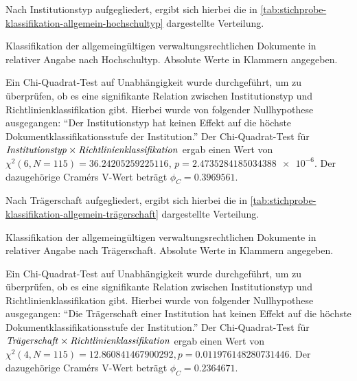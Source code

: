 Nach Institutionstyp aufgegliedert, ergibt sich hierbei die in \cref{tab:stichprobe-klassifikation-allgemein-hochschultyp} dargestellte Verteilung.
\begin{table}[!htbp]
	\caption{Klassifikation der allgemeingültigen verwaltungsrechtlichen Dokumente in relativer Angabe nach Hochschultyp. Absolute Werte in Klammern angegeben.}
    
	\label{tab:stichprobe-klassifikation-allgemein-hochschultyp}
\end{table}
Ein Chi-Quadrat-Test auf Unabhängigkeit wurde durchgeführt, um zu überprüfen, ob es eine signifikante Relation zwischen Institutionstyp und Richtlinienklassifikation gibt.
Hierbei wurde von folgender Nullhypothese ausgegangen:
\enquote{Der Institutionstyp hat keinen Effekt auf die höchste Dokumentklassifikationsstufe der Institution.}
Der Chi-Quadrat-Test für $\text{\textit{Institutionstyp}}\times\text{\textit{Richtlinienklassifikation}}$ ergab einen Wert von $\chi^2 (\num{6}, N = \num{115}) = \num[round-mode=places,round-precision=3]{36,24205259225116}$, $p = \num[round-mode=places,round-precision=3]{2,4735284185034388e-6}$.
Der dazugehörige Cramérs V-Wert beträgt $\phi_C=\num[round-mode=places,round-precision=3]{0.3969561}$.

Nach Trägerschaft aufgegliedert, ergibt sich hierbei die in \cref{tab:stichprobe-klassifikation-allgemein-trägerschaft} dargestellte Verteilung.
\begin{table}[!htbp]
	\caption{Klassifikation der allgemeingültigen verwaltungsrechtlichen Dokumente in relativer Angabe nach Trägerschaft. Absolute Werte in Klammern angegeben.}
    
	\label{tab:stichprobe-klassifikation-allgemein-trägerschaft}
\end{table}
Ein Chi-Quadrat-Test auf Unabhängigkeit wurde durchgeführt, um zu überprüfen, ob es eine signifikante Relation zwischen Institutionstyp und Richtlinienklassifikation gibt.
Hierbei wurde von folgender Nullhypothese ausgegangen:
\enquote{Die Trägerschaft einer Institution hat keinen Effekt auf die höchste Dokumentklassifikationsstufe der Institution.}
Der Chi-Quadrat-Test für $\text{\textit{Trägerschaft}}\times\text{\textit{Richtlinienklassifikation}}$ ergab einen Wert von $\chi^2 (\num{4}, N = \num{115}) = \num[round-mode=places,round-precision=3]{12,860841467900292}, p = \num[round-mode=places,round-precision=3]{0,011976148280731446}$.
Der dazugehörige Cramérs V-Wert beträgt $\phi_C=\num[round-mode=places,round-precision=3]{0.2364671}$.

